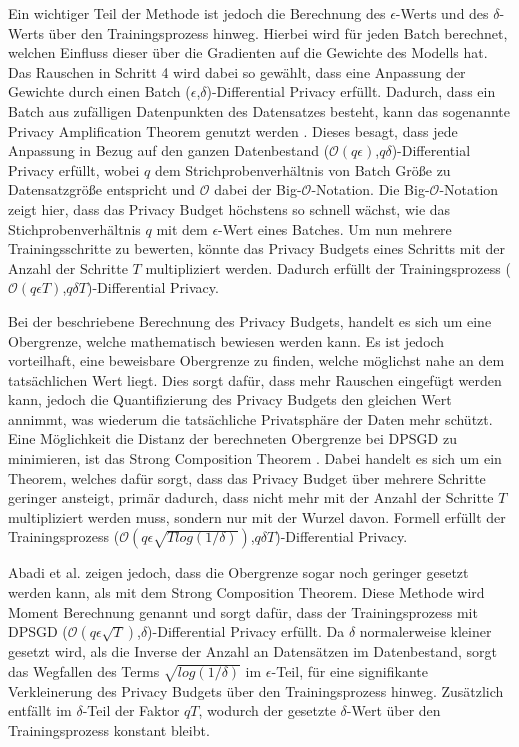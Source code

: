 Ein wichtiger Teil der Methode ist jedoch die Berechnung des $\epsilon$-Werts und des $\delta$-Werts über den Trainingsprozess hinweg.
Hierbei wird für jeden Batch berechnet, welchen Einfluss dieser über die Gradienten auf die Gewichte des Modells hat.
Das Rauschen in Schritt 4 wird dabei so gewählt, dass eine Anpassung der Gewichte durch einen Batch ($\epsilon$,$\delta$)-Differential Privacy erfüllt.
Dadurch, dass ein Batch aus zufälligen Datenpunkten des Datensatzes besteht, kann das sogenannte Privacy Amplification Theorem genutzt werden \cite{P-107}. 
Dieses besagt, dass jede Anpassung in Bezug auf den ganzen Datenbestand ($\mathcal{O}(q\epsilon)$,$q\delta$)-Differential Privacy erfüllt, wobei $q$ dem Strichprobenverhältnis von Batch Größe zu Datensatzgröße entspricht und $\mathcal{O}$ dabei der Big-$\mathcal{O}$-Notation.
Die Big-$\mathcal{O}$-Notation zeigt hier, dass das Privacy Budget höchstens so schnell wächst, wie das Stichprobenverhältnis $q$ mit dem $\epsilon$-Wert eines Batches.
Um nun mehrere Trainingsschritte zu bewerten, könnte das Privacy Budgets eines Schritts mit der Anzahl der Schritte $T$ multipliziert werden. 
Dadurch erfüllt der Trainingsprozess ($\mathcal{O}(q\epsilon T)$,$q\delta T$)-Differential Privacy.

Bei der beschriebene Berechnung des Privacy Budgets, handelt es sich um eine Obergrenze, welche mathematisch bewiesen werden kann.
Es ist jedoch vorteilhaft, eine beweisbare Obergrenze zu finden, welche möglichst nahe an dem tatsächlichen Wert liegt. 
Dies sorgt dafür, dass mehr Rauschen eingefügt werden kann, jedoch die Quantifizierung des Privacy Budgets den gleichen Wert annimmt, was wiederum die tatsächliche Privatsphäre der Daten mehr schützt.
Eine Möglichkeit die Distanz der berechneten Obergrenze bei DPSGD zu minimieren, ist das Strong Composition Theorem \cite{P-27}.
Dabei handelt es sich um ein Theorem, welches dafür sorgt, dass das Privacy Budget über mehrere Schritte geringer ansteigt, primär dadurch, dass nicht mehr mit der Anzahl der Schritte $T$ multipliziert werden muss, sondern nur mit der Wurzel davon.
Formell erfüllt der Trainingsprozess ($\mathcal{O}(q\epsilon \sqrt{T log(1/\delta)})$,$q\delta T$)-Differential Privacy.

Abadi et al. \cite{P-28} zeigen jedoch, dass die Obergrenze sogar noch geringer gesetzt werden kann, als mit dem Strong Composition Theorem.
Diese Methode wird Moment Berechnung genannt und sorgt dafür, dass der Trainingsprozess mit DPSGD ($\mathcal{O}(q\epsilon \sqrt{T})$,$\delta$)-Differential Privacy erfüllt.
Da $\delta$ normalerweise kleiner gesetzt wird, als die Inverse der Anzahl an Datensätzen im Datenbestand, sorgt das Wegfallen des Terms $\sqrt{log (1/\delta)}$ im $\epsilon$-Teil, für eine signifikante Verkleinerung des Privacy Budgets über den Trainingsprozess hinweg.
Zusätzlich entfällt im $\delta$-Teil der Faktor $qT$, wodurch der gesetzte $\delta$-Wert über den Trainingsprozess konstant bleibt.